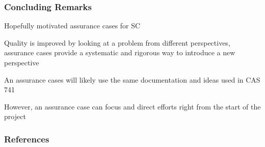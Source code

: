\documentclass[t,12pt,numbers,fleqn]{beamer}
\begin{document}

\begin{frame}
\frametitle{Concluding Remarks}

\bi
\item Hopefully motivated assurance cases for SC
\item Quality is improved by looking at a problem from different perspectives,
  assurance cases provide a systematic and rigorous way to introduce a new
  perspective
\item An assurance cases will likely use the same documentation and ideas used
  in CAS 741
\item However, an assurance case can focus and direct efforts right from the
  start of the project
\ei

\end{frame}


\begin{frame}[allowframebreaks]
\frametitle{References}



\end{frame}

\end{document}
